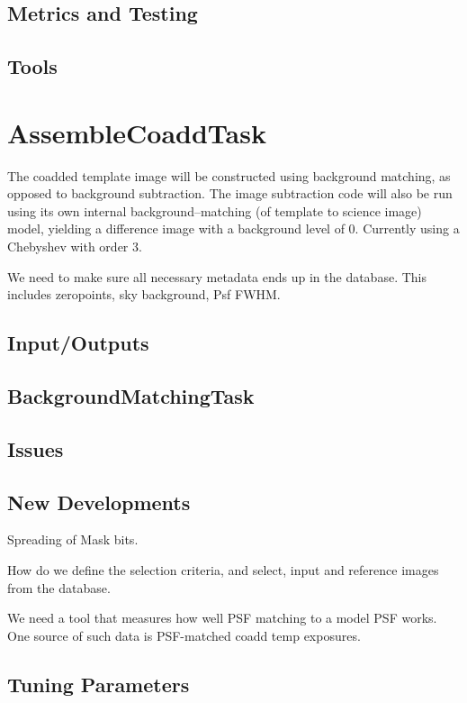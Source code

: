 \documentclass[12pt]{article}
\begin{document}
\subsection{Metrics and Testing}
\subsection{Tools}


\clearpage 
\section{AssembleCoaddTask} 

The coadded template image will be constructed using background
matching, as opposed to background subtraction.  The image subtraction
code will also be run using its own internal background--matching (of
template to science image) model, yielding a difference image with a
background level of 0.  Currently using a Chebyshev with order 3.

We need to make sure all necessary metadata ends up in the database.
This includes zeropoints, sky background, Psf FWHM.

\subsection{Input/Outputs}

\subsection{BackgroundMatchingTask} 

\subsection{Issues}

\subsection{New Developments}
Spreading of Mask bits.  

How do we define the selection criteria, and select, input and
reference images from the database.

We need a tool that measures how well PSF matching to a model PSF
works. One source of such data is PSF-matched coadd temp exposures.

\subsection{Tuning Parameters}
\end{document}
